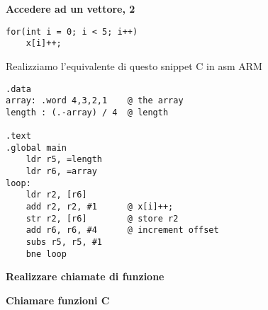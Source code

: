 \begin{exmp}
\textbf{Accedere ad un vettore, 2}
\begin{lstlisting}
for(int i = 0; i < 5; i++)
	x[i]++;
\end{lstlisting}

Realizziamo l'equivalente di questo snippet C in asm ARM


\begin{lstlisting}[style=armn]
.data
array: .word 4,3,2,1    @ the array
length : (.-array) / 4	@ length

.text
.global main
	ldr r5, =length
	ldr r6, =array
loop:
	ldr r2, [r6]
	add r2, r2, #1		@ x[i]++;
	str r2, [r6]		@ store r2
	add r6, r6, #4 		@ increment offset
	subs r5, r5, #1
	bne loop
\end{lstlisting}
\end{exmp}

\begin{exmp}
\textbf{Realizzare chiamate di funzione}
\end{exmp}

\begin{exmp}
\textbf{Chiamare funzioni C}
\end{exmp}

